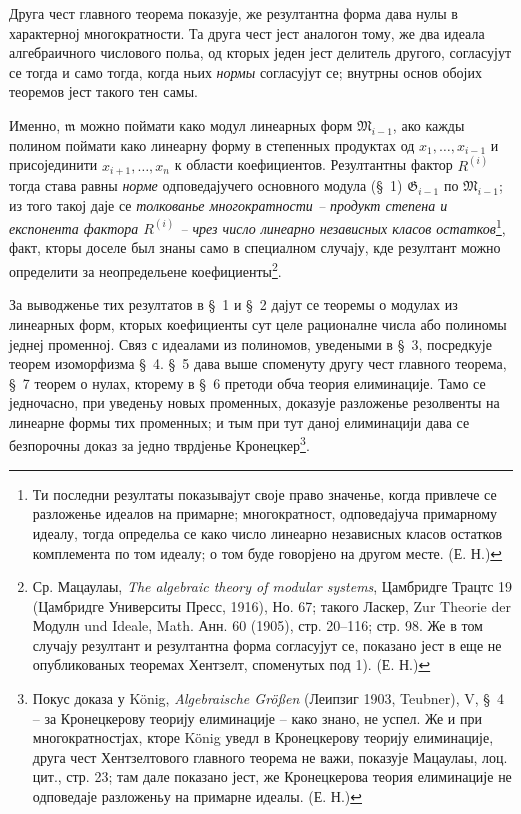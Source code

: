 \documentclass[11pt]{article}
\providecommand{\Gmod}{\mathfrak G}
\providecommand{\mideal}{\mathfrak m}
\begin{document}
Друга чест главного теорема показује, же резултантна форма дава нулы в характерној многократности. Та друга чест јест аналогон тому, же два идеала алгебраичного числового польа, од кторых једен јест делитель другого, согласујут се тогда и само тогда, когда ньих \emph{нормы} согласујут се; внутрны основ обојих теоремов јест такого тен самы.

Именно, $\mideal$ можно поймати како модул линеарных форм $\mathfrak M_{i-1}$, ако кажды полином поймати како линеарну форму в степенных продуктах од $x_1,\ldots,x_{i-1}$ и присојединити $x_{i+1},\ldots,x_n$ к области коефициентов. Резултантны фактор $R^{(i)}$ тогда става равны \emph{норме} одповедајучего основного модула (§~1) $\Gmod_{i-1}$ по $\mathfrak M_{i-1}$; из того такој даје се \emph{толкованье многократности -- продукт степена и експонента фактора $R^{(i)}$ -- чрез число линеарно независных класов остатков}\footnote{Ти последни резултаты показывајут своје право значенье, когда привлече се разложенье идеалов на примарне; многократност, одповедајуча примарному идеалу, тогда определьа се како число линеарно независных класов остатков комплемента по том идеалу; о том буде говорјено на другом месте. (Е. Н.)}, факт, кторы доселе был знаны само в специалном случају, кде резултант можно определити за неопредельене коефициенты\footnote{Ср. Мацаулаы, \emph{The algebraic theory of modular systems}, Цамбридге Трацтс 19 (Цамбридге Университы Пресс, 1916), Но. 67; такого Ласкер, Zur Theorie der Модулн und Ideale, Math. Анн. 60 (1905), стр. 20--116; стр. 98. Же в том случају резултант и резултантна форма согласујут се, показано јест в еще не опубликованых теоремах Хентзелт, споменутых под 1). (Е. Н.)}.

За выводженье тих резултатов в §~1 и §~2 дајут се теоремы о модулах из линеарных форм, кторых коефициенты сут целе рационалне числа або полиномы једнеј променној. Связ с идеалами из полиномов, уведеными в §~3, посредкује теорем изоморфизма §~4. §~5 дава выше споменуту другу чест главного теорема, §~7 теорем о нулах, кторему в §~6 претоди обча теория елиминације. Тамо се једночасно, при уведеньу новых променных, доказује разложенье резолвенты на линеарне формы тих променных; и тым при тут даној елиминацији дава се безпорочны доказ за једно тврдјенье Кронецкер\footnote{Покус доказа у König, \emph{Algebraische Größen} (Леипзиг 1903, Teubner), V, §~4 -- за Кронецкерову теорију елиминације -- како знано, не успел. Же и при многократностјах, кторе König уведл в Кронецкерову теорију елиминације, друга чест Хентзелтового главного теорема не важи, показује Мацаулаы, лоц. цит., стр. 23; там дале показано јест, же Кронецкерова теория елиминације не одповедаје разложеньу на примарне идеалы. (Е. Н.)}.
\end{document}
